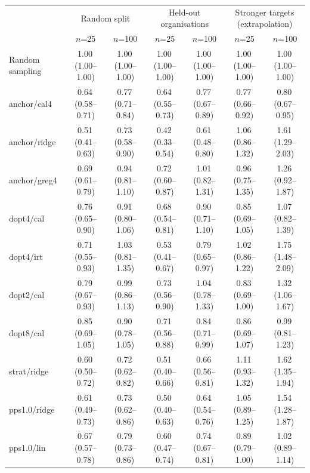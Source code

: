 \begin{tabular}{lcccccc}
\toprule
 & \multicolumn{2}{c}{Random split} & \multicolumn{2}{c}{Held-out organisations} & \multicolumn{2}{c}{Stronger targets (extrapolation)} \\
 & $n$=25 & $n$=100 & $n$=25 & $n$=100 & $n$=25 & $n$=100 \\
\midrule
Random sampling & 1.00\,\scriptsize(1.00--1.00) & 1.00\,\scriptsize(1.00--1.00) & 1.00\,\scriptsize(1.00--1.00) & 1.00\,\scriptsize(1.00--1.00) & 1.00\,\scriptsize(1.00--1.00) & 1.00\,\scriptsize(1.00--1.00) \\
anchor/cal4 & 0.64\,\scriptsize(0.58--0.71) & 0.77\,\scriptsize(0.71--0.84) & 0.64\,\scriptsize(0.55--0.73) & 0.77\,\scriptsize(0.67--0.89) & 0.77\,\scriptsize(0.66--0.92) & 0.80\,\scriptsize(0.67--0.95) \\
anchor/ridge & 0.51\,\scriptsize(0.41--0.63) & 0.73\,\scriptsize(0.58--0.90) & 0.42\,\scriptsize(0.33--0.54) & 0.61\,\scriptsize(0.48--0.80) & 1.06\,\scriptsize(0.86--1.32) & 1.61\,\scriptsize(1.29--2.03) \\
anchor/greg4 & 0.69\,\scriptsize(0.61--0.79) & 0.94\,\scriptsize(0.81--1.10) & 0.72\,\scriptsize(0.60--0.87) & 1.01\,\scriptsize(0.82--1.31) & 0.96\,\scriptsize(0.75--1.35) & 1.26\,\scriptsize(0.92--1.87) \\
dopt4/cal & 0.76\,\scriptsize(0.65--0.90) & 0.91\,\scriptsize(0.80--1.06) & 0.68\,\scriptsize(0.54--0.81) & 0.90\,\scriptsize(0.71--1.10) & 0.85\,\scriptsize(0.69--1.05) & 1.07\,\scriptsize(0.82--1.39) \\
dopt4/irt & 0.71\,\scriptsize(0.55--0.93) & 1.03\,\scriptsize(0.81--1.35) & 0.53\,\scriptsize(0.41--0.67) & 0.79\,\scriptsize(0.65--0.97) & 1.02\,\scriptsize(0.86--1.22) & 1.75\,\scriptsize(1.48--2.09) \\
dopt2/cal & 0.79\,\scriptsize(0.67--0.93) & 0.99\,\scriptsize(0.86--1.13) & 0.73\,\scriptsize(0.56--0.90) & 1.04\,\scriptsize(0.78--1.33) & 0.83\,\scriptsize(0.69--1.00) & 1.32\,\scriptsize(1.06--1.67) \\
dopt8/cal & 0.85\,\scriptsize(0.69--1.05) & 0.90\,\scriptsize(0.78--1.05) & 0.71\,\scriptsize(0.56--0.88) & 0.84\,\scriptsize(0.71--0.99) & 0.86\,\scriptsize(0.69--1.07) & 0.99\,\scriptsize(0.81--1.23) \\
strat/ridge & 0.60\,\scriptsize(0.50--0.72) & 0.72\,\scriptsize(0.62--0.82) & 0.51\,\scriptsize(0.40--0.66) & 0.66\,\scriptsize(0.56--0.81) & 1.11\,\scriptsize(0.93--1.32) & 1.62\,\scriptsize(1.35--1.94) \\
pps1.0/ridge & 0.61\,\scriptsize(0.49--0.73) & 0.73\,\scriptsize(0.62--0.86) & 0.50\,\scriptsize(0.40--0.63) & 0.64\,\scriptsize(0.54--0.76) & 1.05\,\scriptsize(0.89--1.25) & 1.54\,\scriptsize(1.28--1.87) \\
pps1.0/lin & 0.67\,\scriptsize(0.57--0.78) & 0.79\,\scriptsize(0.73--0.86) & 0.60\,\scriptsize(0.47--0.74) & 0.74\,\scriptsize(0.67--0.81) & 0.89\,\scriptsize(0.79--1.00) & 1.02\,\scriptsize(0.89--1.14) \\
\bottomrule
\end{tabular}
